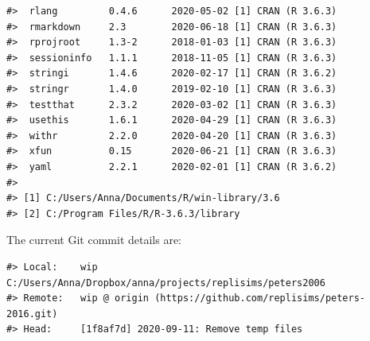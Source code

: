 \documentclass[
  english,
  doc,floatsintext,draftall]{apa6}
\begin{document}
\begin{verbatim}
#>  rlang         0.4.6      2020-05-02 [1] CRAN (R 3.6.3)              
#>  rmarkdown     2.3        2020-06-18 [1] CRAN (R 3.6.3)              
#>  rprojroot     1.3-2      2018-01-03 [1] CRAN (R 3.6.3)              
#>  sessioninfo   1.1.1      2018-11-05 [1] CRAN (R 3.6.3)              
#>  stringi       1.4.6      2020-02-17 [1] CRAN (R 3.6.2)              
#>  stringr       1.4.0      2019-02-10 [1] CRAN (R 3.6.3)              
#>  testthat      2.3.2      2020-03-02 [1] CRAN (R 3.6.3)              
#>  usethis       1.6.1      2020-04-29 [1] CRAN (R 3.6.3)              
#>  withr         2.2.0      2020-04-20 [1] CRAN (R 3.6.3)              
#>  xfun          0.15       2020-06-21 [1] CRAN (R 3.6.3)              
#>  yaml          2.2.1      2020-02-01 [1] CRAN (R 3.6.2)              
#> 
#> [1] C:/Users/Anna/Documents/R/win-library/3.6
#> [2] C:/Program Files/R/R-3.6.3/library
\end{verbatim}

The current Git commit details are:

\begin{verbatim}
#> Local:    wip C:/Users/Anna/Dropbox/anna/projects/replisims/peters2006
#> Remote:   wip @ origin (https://github.com/replisims/peters-2016.git)
#> Head:     [1f8af7d] 2020-09-11: Remove temp files
\end{verbatim}
\end{document}
